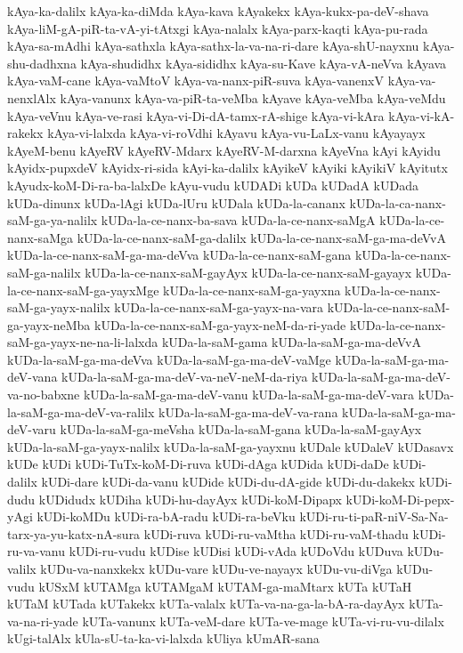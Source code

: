 {kAya-ka-dalilx
kAya-ka-diMda
kAya-kava
kAyakekx
kAya-kukx-pa-deV-shava
kAya-liM-gA-piR-ta-vA-yi-tAtxgi
kAya-nalalx
kAya-parx-kaqti
kAya-pu-rada
kAya-sa-mAdhi
kAya-sathxla
kAya-sathx-la-va-na-ri-dare
kAya-shU-nayxnu
kAya-shu-dadhxna
kAya-shudidhx
kAya-sididhx
kAya-su-Kave
kAya-vA-neVva
kAyava
kAya-vaM-cane
kAya-vaMtoV
kAya-va-nanx-piR-suva
kAya-vanenxV
kAya-va-nenxlAlx
kAya-vanunx
kAya-va-piR-ta-veMba
kAyave
kAya-veMba
kAya-veMdu
kAya-veVnu
kAya-ve-rasi
kAya-vi-Di-dA-tamx-rA-shige
kAya-vi-kAra
kAya-vi-kA-rakekx
kAya-vi-lalxda
kAya-vi-roVdhi
kAyavu
kAya-vu-LaLx-vanu
kAyayayx
kAyeM-benu
kAyeRV
kAyeRV-Mdarx
kAyeRV-M-darxna
kAyeVna
kAyi
kAyidu
kAyidx-pupxdeV
kAyidx-ri-sida
kAyi-ka-dalilx
kAyikeV
kAyiki
kAyikiV
kAyitutx
kAyudx-koM-Di-ra-ba-lalxDe
kAyu-vudu
kUDADi
kUDa
kUDadA
kUDada
kUDa-dinunx
kUDa-lAgi
kUDa-lUru
kUDala
kUDa-la-cananx
kUDa-la-ca-nanx-saM-ga-ya-nalilx
kUDa-la-ce-nanx-ba-sava
kUDa-la-ce-nanx-saMgA
kUDa-la-ce-nanx-saMga
kUDa-la-ce-nanx-saM-ga-dalilx
kUDa-la-ce-nanx-saM-ga-ma-deVvA
kUDa-la-ce-nanx-saM-ga-ma-deVva
kUDa-la-ce-nanx-saM-gana
kUDa-la-ce-nanx-saM-ga-nalilx
kUDa-la-ce-nanx-saM-gayAyx
kUDa-la-ce-nanx-saM-gayayx
kUDa-la-ce-nanx-saM-ga-yayxMge
kUDa-la-ce-nanx-saM-ga-yayxna
kUDa-la-ce-nanx-saM-ga-yayx-nalilx
kUDa-la-ce-nanx-saM-ga-yayx-na-vara
kUDa-la-ce-nanx-saM-ga-yayx-neMba
kUDa-la-ce-nanx-saM-ga-yayx-neM-da-ri-yade
kUDa-la-ce-nanx-saM-ga-yayx-ne-na-li-lalxda
kUDa-la-saM-gama
kUDa-la-saM-ga-ma-deVvA
kUDa-la-saM-ga-ma-deVva
kUDa-la-saM-ga-ma-deV-vaMge
kUDa-la-saM-ga-ma-deV-vana
kUDa-la-saM-ga-ma-deV-va-neV-neM-da-riya
kUDa-la-saM-ga-ma-deV-va-no-babxne
kUDa-la-saM-ga-ma-deV-vanu
kUDa-la-saM-ga-ma-deV-vara
kUDa-la-saM-ga-ma-deV-va-ralilx
kUDa-la-saM-ga-ma-deV-va-rana
kUDa-la-saM-ga-ma-deV-varu
kUDa-la-saM-ga-meVsha
kUDa-la-saM-gana
kUDa-la-saM-gayAyx
kUDa-la-saM-ga-yayx-nalilx
kUDa-la-saM-ga-yayxnu
kUDale
kUDaleV
kUDasavx
kUDe
kUDi
kUDi-TuTx-koM-Di-ruva
kUDi-dAga
kUDida
kUDi-daDe
kUDi-dalilx
kUDi-dare
kUDi-da-vanu
kUDide
kUDi-du-dA-gide
kUDi-du-dakekx
kUDi-dudu
kUDidudx
kUDiha
kUDi-hu-dayAyx
kUDi-koM-Dipapx
kUDi-koM-Di-pepx-yAgi
kUDi-koMDu
kUDi-ra-bA-radu
kUDi-ra-beVku
kUDi-ru-ti-paR-niV-Sa-Na-tarx-ya-yu-katx-nA-sura
kUDi-ruva
kUDi-ru-vaMtha
kUDi-ru-vaM-thadu
kUDi-ru-va-vanu
kUDi-ru-vudu
kUDise
kUDisi
kUDi-vAda
kUDoVdu
kUDuva
kUDu-valilx
kUDu-va-nanxkekx
kUDu-vare
kUDu-ve-nayayx
kUDu-vu-diVga
kUDu-vudu
kUSxM
kUTAMga
kUTAMgaM
kUTAM-ga-maMtarx
kUTa
kUTaH
kUTaM
kUTada
kUTakekx
kUTa-valalx
kUTa-va-na-ga-la-bA-ra-dayAyx
kUTa-va-na-ri-yade
kUTa-vanunx
kUTa-veM-dare
kUTa-ve-mage
kUTa-vi-ru-vu-dilalx
kUgi-talAlx
kUla-sU-ta-ka-vi-lalxda
kUliya
kUmAR-sana
}
